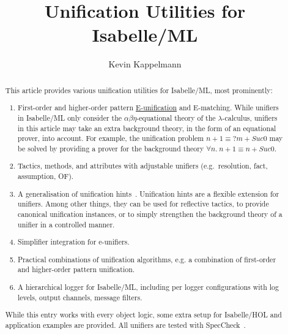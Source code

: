 \documentclass[11pt,a4paper]{article}
\begin{document}
\title{Unification Utilities for Isabelle/ML}
\author{Kevin Kappelmann}
\maketitle

\begin{abstract}
This article provides various unification utilities for Isabelle/ML, most prominently:
\begin{enumerate}
\item First-order and higher-order pattern
\href{https://en.wikipedia.org/wiki/Unification_(computer_science)#E-unification}{E-unification}
and E-matching.
While unifiers in Isabelle/ML only consider the $\alpha\beta\eta$-equational theory of the $\lambda$-calculus,
unifiers in this article
may take an extra background theory, in the form of an equational prover, into account.
For example, the unification problem $n + 1 \equiv {}?m + Suc 0$
may be solved by providing a prover for the background theory $\forall n.\ n + 1 \equiv n + Suc 0$.
\item Tactics, methods, and attributes with adjustable unifiers (e.g.\ resolution, fact, assumption, OF).
\item A generalisation of unification hints~\cite{unif-hints}.
Unification hints are a flexible extension for unifiers.
Among other things, they can be used for reflective tactics,
to provide canonical unification instances,
or to simply strengthen the background theory of a unifier in a controlled manner.
\item Simplifier integration for e-unifiers.
\item Practical combinations of unification algorithms, e.g. a combination of first-order and
higher-order pattern unification.
\item A hierarchical logger for Isabelle/ML,
including per logger configurations with log levels, output channels, message filters.
\end{enumerate}
While this entry works with every object logic,
some extra setup for Isabelle/HOL and application examples are provided.
All unifiers are tested with SpecCheck~\cite{speccheck}.
\end{abstract}

\tableofcontents





\end{document}
